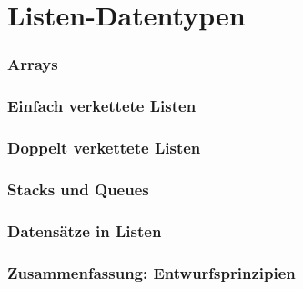 \documentclass[handout]{beamer}
\subtitle{Listen-Datentypen}
\begin{document}
\maketitle

\part{Listen-Datentypen}

\section{Arrays}
	
\section{Einfach verkettete Listen}
	
\section{Doppelt verkettete Listen}
	
\section{Stacks und Queues}
	
	
    
\section{Datensätze in Listen}
	
\section{Zusammenfassung: Entwurfsprinzipien}
	
        
\end{document}
